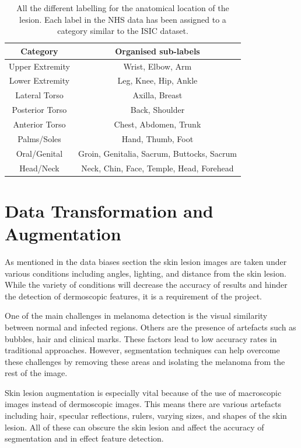 \begin{table}
	\centering
	\begin{tabular}{|c|c|}
		\hline
		Category        & Organised sub-labels
		\\
		\hline
		Upper Extremity & Wrist, Elbow, Arm
		\\
		\hline
		Lower Extremity & Leg, Knee, Hip, Ankle
		\\
		\hline
		Lateral Torso   & Axilla, Breast
		\\
		\hline
		Posterior Torso & Back, Shoulder
		\\
		\hline
		Anterior Torso  & Chest, Abdomen, Trunk
		\\
		\hline
		Palms/Soles     & Hand, Thumb, Foot
		\\
		\hline
		Oral/Genital    & Groin, Genitalia, Sacrum, Buttocks, Sacrum
		\\
		\hline
		Head/Neck       & Neck, Chin, Face, Temple, Head, Forehead
		\\
		\hline
	\end{tabular}
	\caption{All the different labelling for the anatomical location of the lesion. Each label in the NHS data has been assigned to a category similar to the ISIC dataset.}
\end{table}\label{nhs-location-names}


\section{Data Transformation and Augmentation}
As mentioned in the data biases section the skin lesion images are taken under various conditions including angles, lighting, and distance from the skin lesion. While the variety of conditions will decrease the accuracy of results and hinder the detection of dermoscopic features, it is a requirement of the project.

One of the main challenges in melanoma detection is the visual similarity between normal and infected regions. Others are the presence of artefacts such as bubbles, hair and clinical marks\cite{Albahli2020}. These factors lead to low accuracy rates in traditional approaches. However, segmentation techniques can help overcome these challenges by removing these areas and isolating the melanoma from the rest of the image.

Skin lesion augmentation is especially vital because of the use of macroscopic images instead of dermoscopic images. This means there are various artefacts including hair, specular reflections, rulers, varying sizes, and shapes of the skin lesion. All of these can obscure the skin lesion and affect the accuracy of segmentation\cite{Unver2019} and in effect feature detection.

